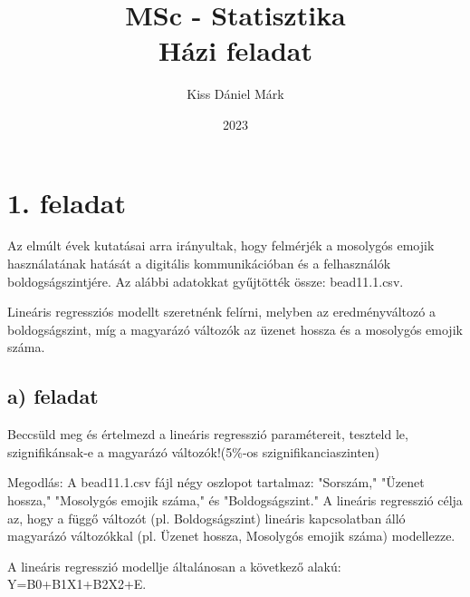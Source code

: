\documentclass[11pt,a4paper,oneside]{report}
\title{\Huge{MSc - Statisztika}\\Házi feladat}
\author{\huge{Kiss Dániel Márk}}
\date{2023}
\begin{document}
\maketitle
\newpage
\tableofcontents
\pagebreak

\chapter{1. feladat}

Az elmúlt évek kutatásai arra irányultak, hogy felmérjék a mosolygós emojik használatának hatását a digitális kommunikációban
és a felhasználók boldogságszintjére. Az alábbi adatokkat gyűjtötték össze: bead11.1.csv.

Lineáris regressziós modellt szeretnénk felírni, melyben az eredményváltozó a boldogságszint, míg a magyarázó változók az üzenet hossza és
a mosolygós emojik száma.
\section{a) feladat}
Beccsüld meg és értelmezd a lineáris regresszió paramétereit, teszteld le, szignifikánsak-e a magyarázó változók!(5\%-os szignifikanciaszinten)

Megodlás:
A bead11.1.csv fájl négy oszlopot tartalmaz: "Sorszám," "Üzenet hossza," "Mosolygós emojik száma," és "Boldogságszint."
A lineáris regresszió célja az, hogy a függő változót (pl. Boldogságszint) lineáris kapcsolatban álló magyarázó változókkal (pl. Üzenet hossza, Mosolygós emojik száma) modellezze.

A lineáris regresszió modellje általánosan a következő alakú:
Y=B0+B1X1+B2X2+E.
\end{document}
